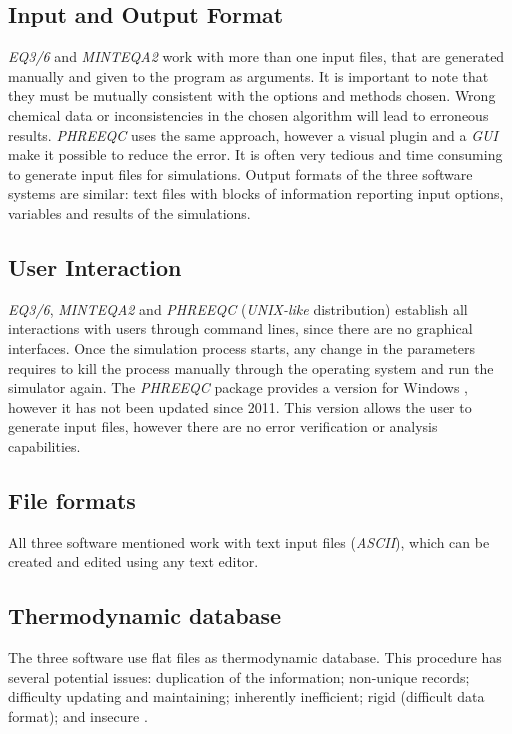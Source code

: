 \documentclass[preprint,12pt,3p]{elsarticle}
\begin{document}
\subsection{Input and Output Format}
\emph{EQ3/6} and \emph{MINTEQA2} work with more than one input files, that are generated manually and given to the program as arguments. It is important to note that they must be mutually consistent with the options and methods chosen. Wrong chemical data or inconsistencies in the chosen algorithm will lead to erroneous results. \emph{PHREEQC} uses the same approach, however a visual plugin \cite{NotPhree:11} and a \emph{GUI} \cite{pfw:11} make it possible to reduce the error. It is often very tedious and time consuming to generate input files for simulations. Output formats of the three software systems are similar: text files with blocks of information reporting input options, variables and results of the simulations.

\subsection{User Interaction}
\emph{EQ3/6}, \emph{MINTEQA2} and \emph{PHREEQC} (\emph{UNIX-like} distribution) establish all interactions with users through command lines, since there are no graphical interfaces. Once the simulation process starts, any change in the parameters requires to kill the process manually through the operating system and run the simulator again. The \emph{PHREEQC} package provides a version for Windows \cite{pfw:11}, however it has not been updated since 2011. This version allows the user to generate input files, however there are no error verification or analysis capabilities.

\subsection{File formats}
All three software mentioned work with text input files (\emph{ASCII}), which can be created and edited using any text editor.

\subsection{Thermodynamic database}
The three software use flat files as thermodynamic database. This procedure has several potential issues: duplication of the information; non-unique records; difficulty updating and maintaining; inherently inefficient; rigid (difficult data format); and insecure \cite{dauerer2000system}.
\end{document}
